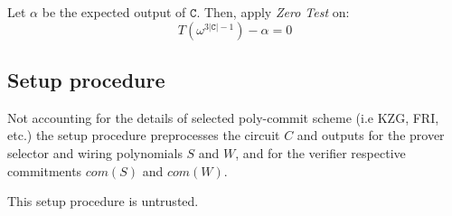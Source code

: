 \documentclass[../lecture-notes.tex]{subfiles}
\begin{document}
Let \(\alpha\) be the expected output of \(\texttt{C}\). Then, apply \textit{Zero Test} on:
\[T(\omega^{3 |\texttt{C}| - 1}) - \alpha = 0\]

\subsection{Setup procedure}

Not accounting for the details of selected poly-commit scheme (i.e KZG, FRI, etc.) the setup procedure preprocesses the circuit \(C\) and outputs for the prover selector and wiring polynomials \(S\) and \(W\), and for the verifier respective commitments \(com(S)\) and \(com(W)\).

\begin{remark}
This setup procedure is untrusted.
\end{remark}
\end{document}
